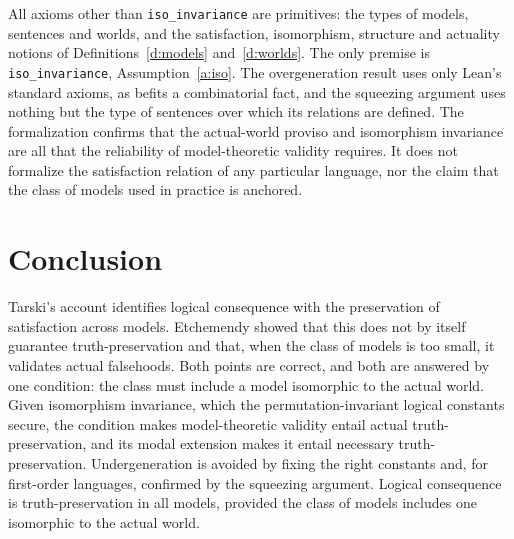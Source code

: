 \documentclass{situationist-preprint}
\begin{document}
All axioms other than \texttt{iso\_invariance} are primitives: the types of models, sentences and worlds, and the satisfaction, isomorphism, structure and actuality notions of Definitions~\ref{d:models} and~\ref{d:worlds}. The only premise is \texttt{iso\_invariance}, Assumption~\ref{a:iso}. The overgeneration result uses only Lean's standard axioms, as befits a combinatorial fact, and the squeezing argument uses nothing but the type of sentences over which its relations are defined. The formalization confirms that the actual-world proviso and isomorphism invariance are all that the reliability of model-theoretic validity requires. It does not formalize the satisfaction relation of any particular language, nor the claim that the class of models used in practice is anchored.

\section{Conclusion}

Tarski's account identifies logical consequence with the preservation of satisfaction across models. Etchemendy showed that this does not by itself guarantee truth-preservation and that, when the class of models is too small, it validates actual falsehoods. Both points are correct, and both are answered by one condition: the class must include a model isomorphic to the actual world. Given isomorphism invariance, which the permutation-invariant logical constants secure, the condition makes model-theoretic validity entail actual truth-preservation, and its modal extension makes it entail necessary truth-preservation. Undergeneration is avoided by fixing the right constants and, for first-order languages, confirmed by the squeezing argument. Logical consequence is truth-preservation in all models, provided the class of models includes one isomorphic to the actual world.
\end{document}
